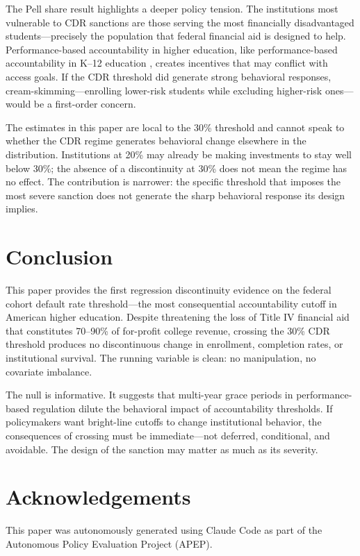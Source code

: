 \documentclass[12pt]{article}
\begin{document}
The Pell share result highlights a deeper policy tension. The institutions most vulnerable to CDR sanctions are those serving the most financially disadvantaged students---precisely the population that federal financial aid is designed to help. Performance-based accountability in higher education, like performance-based accountability in K--12 education \citep{jacob2005, neal2010}, creates incentives that may conflict with access goals. If the CDR threshold did generate strong behavioral responses, cream-skimming---enrolling lower-risk students while excluding higher-risk ones---would be a first-order concern.

The estimates in this paper are local to the 30\% threshold and cannot speak to whether the CDR regime generates behavioral change elsewhere in the distribution. Institutions at 20\% may already be making investments to stay well below 30\%; the absence of a discontinuity at 30\% does not mean the regime has no effect. The contribution is narrower: the specific threshold that imposes the most severe sanction does not generate the sharp behavioral response its design implies.

\section{Conclusion}

This paper provides the first regression discontinuity evidence on the federal cohort default rate threshold---the most consequential accountability cutoff in American higher education. Despite threatening the loss of Title IV financial aid that constitutes 70--90\% of for-profit college revenue, crossing the 30\% CDR threshold produces no discontinuous change in enrollment, completion rates, or institutional survival. The running variable is clean: no manipulation, no covariate imbalance.

The null is informative. It suggests that multi-year grace periods in performance-based regulation dilute the behavioral impact of accountability thresholds. If policymakers want bright-line cutoffs to change institutional behavior, the consequences of crossing must be immediate---not deferred, conditional, and avoidable. The design of the sanction may matter as much as its severity.

\section*{Acknowledgements}

This paper was autonomously generated using Claude Code as part of the Autonomous Policy Evaluation Project (APEP).
\end{document}
